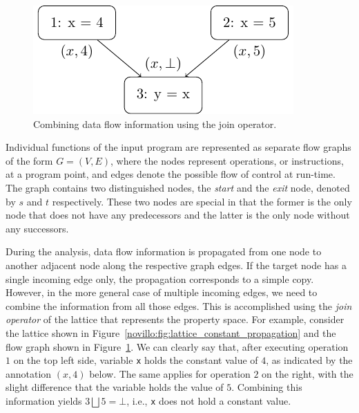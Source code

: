 \begin{figure}[b]
  \vspace{-1em}
  \begin{center}
    \includegraphics{contr_flow_graph}
  \end{center}
  \vspace{-1em}
  \caption{Combining data flow information using the join operator.}
  \label{novillo:fig:control_flow_graph}
  \vspace{-1em}
\end{figure}

Individual functions of the input program are represented as separate flow
graphs of the form $G = (V,E)$, where the nodes represent operations, or
instructions, at a program point, and edges denote the possible flow of control
at run-time. The graph contains two distinguished nodes, the \emph{start} and
the \emph{exit} node, denoted by $s$ and $t$ respectively. These two nodes are
special in that the former is the only node that does not have any predecessors
and the latter is the only node without any successors.

During the analysis, data flow information is propagated from one node to
another adjacent node along the respective graph edges. If the target node has a
single incoming edge only, the propagation corresponds to a simple copy.
However, in the more general case of multiple incoming edges, we need to combine
the information from all those edges. This is accomplished using the \emph{join
operator} of the lattice that represents the property space. For example,
consider the lattice shown in
Figure~\ref{novillo:fig:lattice_constant_propagation} and the flow graph shown
in Figure~\ref{novillo:fig:control_flow_graph}. We can clearly say that, after
executing operation $1$ on the top left side, variable \texttt{x} holds the
constant value of $4$, as indicated by the annotation $(x, 4)$ below. The same
applies for operation $2$ on the right, with the slight difference that the
variable holds the value of $5$. Combining this information yields $3 \bigsqcup
5 = \bot$, i.e., \texttt{x} does not hold a constant value.

